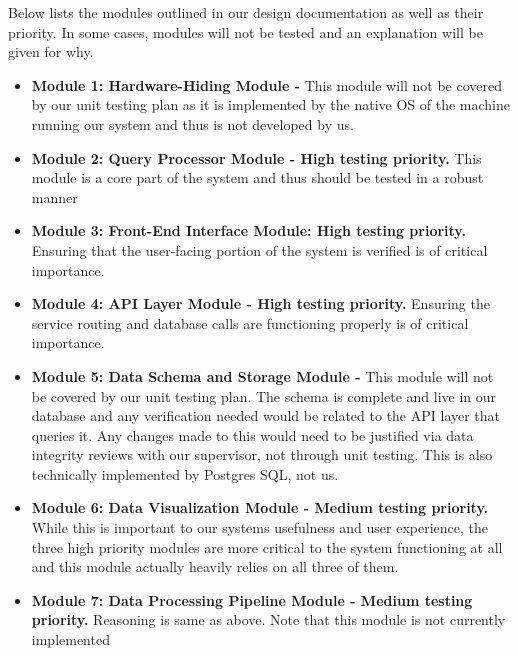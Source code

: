 \documentclass[12pt, titlepage]{article}
\begin{document}
\begin{flushleft}

Below lists the modules outlined in our design documentation as well as their priority. In some
cases, modules will not be tested and an explanation will be given for why.

\begin{itemize}
  \item \textbf{Module 1: Hardware-Hiding Module -} This module will not be covered by our unit
  testing plan as it is implemented by the native OS of the machine running our system and thus
  is not developed by us.
  \item \textbf{Module 2: Query Processor Module - High testing priority. }This module is a core part
  of the system and thus should be tested in a robust manner
  \item \textbf{Module 3: Front-End Interface Module: High testing priority. }Ensuring that the user-facing
  portion of the system is verified is of critical importance.
  \item \textbf{Module 4: API Layer Module - High testing priority. }Ensuring the service routing and database calls
  are functioning properly is of critical importance.
  \item \textbf{Module 5: Data Schema and Storage Module -} This module will not be covered by our unit testing plan.
  The schema is complete and live in our database and any verification needed would be related to the API layer that queries it.
  Any changes made to this would need to be justified via data integrity reviews with our supervisor, not through unit testing. This is
  also technically implemented by Postgres SQL, not us.
  \item \textbf{Module 6: Data Visualization Module - Medium testing priority. }While this is important to our systems usefulness and
  user experience, the three high priority modules are more critical to the system functioning at all and this module
  actually heavily relies on all three of them.
  \item \textbf{Module 7: Data Processing Pipeline Module - Medium testing priority. }Reasoning is same as above. Note that this module is not currently implemented

\end{itemize}
\end{flushleft}
\end{document}
